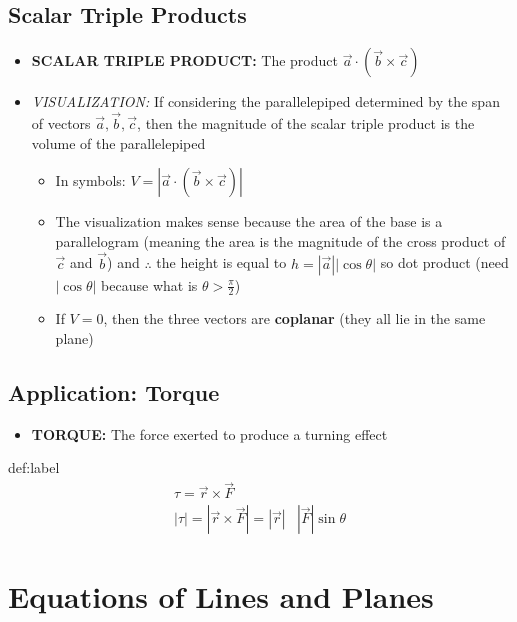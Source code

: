 \documentclass{package/notes}
\begin{document}
\subsection{Scalar Triple Products}

	\begin{itemize}
		\item \textbf{SCALAR TRIPLE PRODUCT:} The product $\vec a \cdot (\vec b \times \vec c)$ 
		\item \textit{VISUALIZATION:} If considering the parallelepiped determined by the span of vectors $\vec a, \vec b, \vec c$, then the magnitude of the scalar triple product is the volume of the parallelepiped
		\begin{itemize}
			\item In symbols: $V = |\vec a \cdot (\vec b \times \vec c)|$
			\item The visualization makes sense because the area of the base is a parallelogram (meaning the area is the magnitude of the cross product of $\vec c$ and $\vec b$) and $\therefore$ the height is equal to $h = |\vec a| |\cos \theta|$ so dot product (need $|\cos\theta|$ because what is $\theta>\frac{\pi}{2}$)
			\item If $ V = 0$, then the three vectors are \textbf{coplanar} (they all lie in the same plane)
		\end{itemize}
	\end{itemize}

\subsection{Application: Torque}

	\begin{itemize}
		\item \textbf{TORQUE:} The force exerted to produce a turning effect
	\end{itemize}

	\begin{definition}[Torque]{def:label}
		$$
		\begin{aligned}
			\tau = \vec r \times \vec F&\\
			|\tau| = |\vec r \times \vec F| = |\vec r|&|\vec F|\sin\theta
		\end{aligned}
		$$
		\end{definition}


\section{Equations of Lines and Planes}
\end{document}
